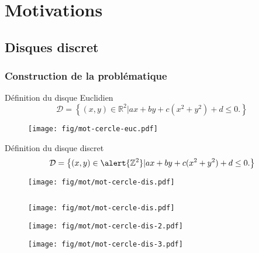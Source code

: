 \section{Motivations}

\subsection{Disques discret}

\begin{frame}
\frametitle{Construction de la problématique}
  {
    \begin{block}{Définition du disque Euclidien}
      $$\mathcal{D} =  \left\{ (x,y) \in \mathbb{R}^{2} |  ax + by + c(x^2 + y^2) + d \leq 0. \right\}$$
    \end{block}
    
    \begin{figure}[h!]
      \centering
      \texttt{[image: fig/mot-cercle-euc.pdf]}
    \end{figure}
        
  }
  {
    \begin{block}{Définition du disque discret}
      $$\mathcal{D} =  \left\{ (x,y) \in \alert{\mathbb{Z}^{2}} |  ax + by + c(x^2 + y^2) + d \leq 0. \right\}$$
    \end{block}
  }
  {  
    \begin{figure}[h!]
      \centering
      \texttt{[image: fig/mot/mot-cercle-dis.pdf]}
    \end{figure}
  }
  
  \begin{columns}[t]
    \begin{column}{6cm}
      {
        \begin{figure}[h!]
          \centering
          \texttt{[image: fig/mot/mot-cercle-dis.pdf]}
        \end{figure}
      }
      {
        \begin{figure}[h!]
          \centering
          \texttt{[image: fig/mot/mot-cercle-dis-2.pdf]}
        \end{figure}
      }
      {
        \begin{figure}[h!]
          \centering
          \texttt{[image: fig/mot/mot-cercle-dis-3.pdf]}
        \end{figure}
      }          
      \end{column}
      \begin{column}{5cm}
        \vspace{-0.4cm}
        

\end{column}
\end{columns}
\end{frame}
